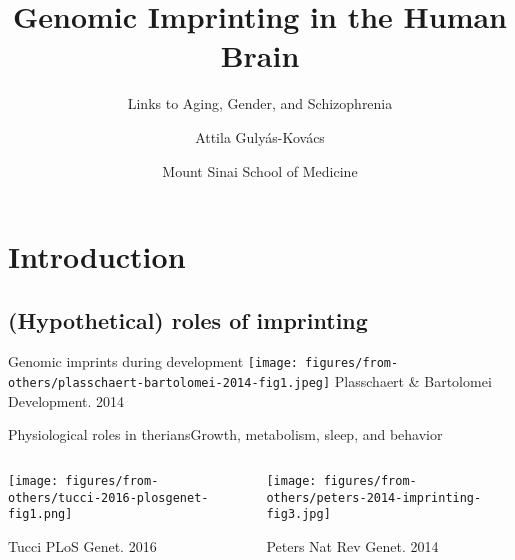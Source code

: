 \documentclass{beamer}
\title{Genomic Imprinting in the Human Brain}
\subtitle{Links to Aging, Gender, and Schizophrenia}
\author{Attila Guly\'{a}s-Kov\'{a}cs}
\date{Mount Sinai School of Medicine}
\begin{document}
\maketitle

\section{Introduction}
\subsection{(Hypothetical) roles of imprinting}

\begin{frame}{Genomic imprints during development}
\texttt{[image: figures/from-others/plasschaert-bartolomei-2014-fig1.jpeg]}
\vfill
{\tiny Plasschaert \& Bartolomei Development. 2014}
\end{frame}

\begin{frame}{Physiological roles in therians}{Growth, metabolism, sleep, and behavior}
\begin{columns}[t]
\begin{column}{0.4\textwidth}

\texttt{[image: figures/from-others/tucci-2016-plosgenet-fig1.png]}

{\tiny Tucci PLoS Genet. 2016}
\end{column}

\begin{column}{0.6\textwidth}

\texttt{[image: figures/from-others/peters-2014-imprinting-fig3.jpg]}

{\tiny Peters Nat Rev Genet. 2014}
\end{column}
\end{columns}
\end{frame}
\end{document}
